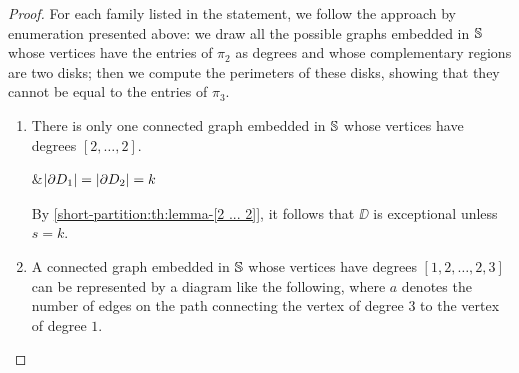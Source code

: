 \begin{proof}
For each family listed in the statement, we follow the approach by enumeration presented above: we draw all the possible graphs embedded in $\mathbb{S}{}$ whose vertices have the entries of $\pi_2$ as degrees and whose complementary regions are two disks; then we compute the perimeters of these disks, showing that they cannot be equal to the entries of $\pi_3$.
\begin{enumerate}[(1)]
\item There is only one connected graph embedded in $\mathbb{S}{}$ whose vertices have degrees $[2,\ldots,2]$.
\begin{dessintext}
&$\begin{aligned}
&\lvert \partial D_1\rvert=\lvert \partial D_2\rvert=k
\end{aligned}$
\end{dessintext}
By \cref{short-partition:th:lemma-[2 ... 2]}, it follows that $\DD$ is exceptional unless $s=k$.
\item A connected graph embedded in $\mathbb{S}{}$ whose vertices have degrees $[1,2,\ldots,2,3]$ can be represented by a diagram like the following, where $a$ denotes the number of edges on the path connecting the vertex of degree $3$ to the vertex of degree $1$.


\end{enumerate}
\end{proof}
